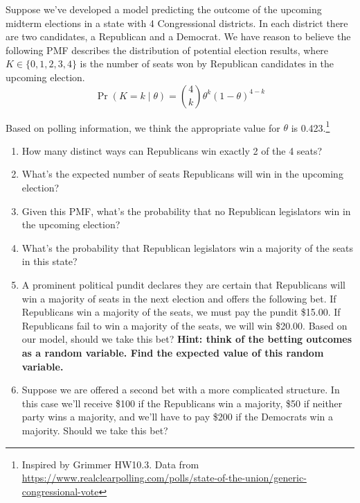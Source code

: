 \documentclass[11pt]{article}
\begin{document}
Suppose we've developed a model predicting the outcome of the upcoming
midterm elections in a state with 4 Congressional districts. In each
district there are two candidates, a Republican and a Democrat. We have
reason to believe the following PMF describes the distribution of
potential election results, where $K \in \{0, 1, 2, 3, 4\}$ is the
number of seats won by Republican candidates in the upcoming election.
$$
\Pr(K = k \mid \theta) = \binom{4}{k} \theta^{k} (1-\theta)^{4-k}
$$

Based on polling information, we think the appropriate value for
$\theta$ is 0.423.\footnote{Inspired by Grimmer HW10.3. Data from
  \url{https://www.realclearpolling.com/polls/state-of-the-union/generic-congressional-vote}}

\begin{enumerate}[label=\alph*.]
\item How many distinct ways can Republicans win exactly 2 of the 4 seats?
\item What's the expected number of seats Republicans will win in the
  upcoming election?
\item Given this PMF, what's the probability that no Republican
  legislators win in the upcoming election?
\item What's the probability that Republican legislators win a majority
  of the seats in this state?
\item A prominent political pundit declares they are certain that
  Republicans will win a majority of seats in the next election and
  offers the following bet. If Republicans win a majority of the seats,
  we must pay the pundit \$15.00. If Republicans fail to win a majority
  of the seats, we will win \$20.00. Based on our model, should we take
  this bet? \textbf{Hint: think of the betting outcomes as a random
  variable. Find the expected value of this random variable.}
\item Suppose we are offered a second bet with a more complicated
  structure. In this case we'll receive \$100 if the Republicans win a
  majority, \$50 if neither party wins a majority, and we'll have to pay
  \$200 if the Democrats win a majority. Should we take this bet?
\end{enumerate}


\end{document}
